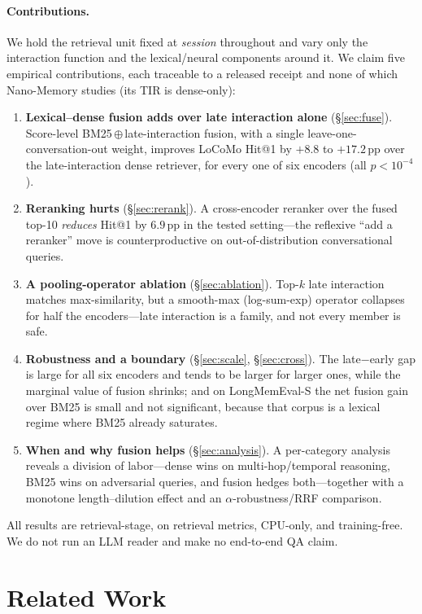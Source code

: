 \documentclass[10pt,twocolumn]{article}
\newcommand{\oxor}{\ensuremath{\oplus}}
\begin{document}
\paragraph{Contributions.}
We hold the retrieval unit fixed at \emph{session} throughout and vary only
the interaction function and the lexical/neural components around it. We claim
five empirical contributions, each traceable to a released receipt and
none of which Nano-Memory studies (its TIR is dense-only):
\begin{enumerate}\itemsep1pt
  \item \textbf{Lexical--dense fusion adds over late interaction alone}
  (\S\ref{sec:fuse}). Score-level BM25\,\oxor{}\,late-interaction fusion, with
  a single leave-one-conversation-out weight, improves LoCoMo Hit@1 by
  $+8.8$ to $+17.2$\,pp over the late-interaction dense retriever, for every
  one of six encoders (all $p<10^{-4}$).
  \item \textbf{Reranking hurts} (\S\ref{sec:rerank}). A cross-encoder
  reranker over the fused top-10 \emph{reduces} Hit@1 by $6.9$\,pp in the
  tested setting---the reflexive ``add a reranker'' move is counterproductive
  on out-of-distribution conversational queries.
  \item \textbf{A pooling-operator ablation} (\S\ref{sec:ablation}). Top-$k$
  late interaction matches max-similarity, but a smooth-max (log-sum-exp)
  operator collapses for half the encoders---late interaction is a family, and
  not every member is safe.
  \item \textbf{Robustness and a boundary} (\S\ref{sec:scale},
  \S\ref{sec:cross}). The late$-$early gap is large for all six encoders and
  tends to be larger for larger ones, while the marginal value of fusion
  shrinks; and on LongMemEval-S the net fusion gain over BM25 is small and not
  significant, because that corpus is a lexical regime where BM25 already
  saturates.
  \item \textbf{When and why fusion helps} (\S\ref{sec:analysis}). A
  per-category analysis reveals a division of labor---dense wins on
  multi-hop/temporal reasoning, BM25 wins on adversarial queries, and fusion
  hedges both---together with a monotone length--dilution effect and an
  $\alpha$-robustness/RRF comparison.
\end{enumerate}
All results are retrieval-stage, on retrieval metrics, CPU-only, and
training-free. We do not run an LLM reader and make no end-to-end QA claim.

\section{Related Work}
\label{sec:related}
\end{document}
